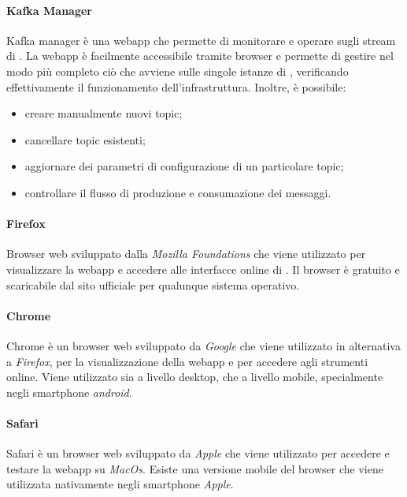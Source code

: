 				\paragraph{Kafka Manager}
					Kafka manager è una webapp che permette di monitorare e operare sugli stream di . La webapp è facilmente accessibile tramite browser e permette di gestire nel modo più completo ciò che avviene sulle singole istanze di , verificando effettivamente il funzionamento dell'infrastruttura. Inoltre, è possibile:
					\begin{itemize}
					 	\item creare manualmente nuovi topic;
					 	\item cancellare topic esistenti;
					 	\item aggiornare dei parametri di configurazione di un particolare topic;
					 	\item controllare il flusso di produzione e consumazione dei messaggi.
					 \end{itemize} 

				\paragraph{Firefox} 
					Browser web sviluppato dalla \textit{Mozilla Foundations} che viene utilizzato per visualizzare la webapp e accedere alle interfacce online di . Il browser è gratuito e scaricabile dal sito ufficiale per qualunque sistema operativo.

				\paragraph{Chrome} 
					Chrome è un browser web sviluppato da \textit{Google} che viene utilizzato in alternativa a \textit{Firefox}, per la visualizzazione della webapp e per accedere agli strumenti online. Viene utilizzato sia a livello desktop, che a livello mobile, specialmente negli smartphone \textit{android}.

				\paragraph{Safari} 
					Safari è un browser web sviluppato da \textit{Apple} che viene utilizzato per accedere e testare la webapp su \textit{MacOs}. Esiste una versione mobile del browser che viene utilizzata nativamente negli smartphone \textit{Apple}.